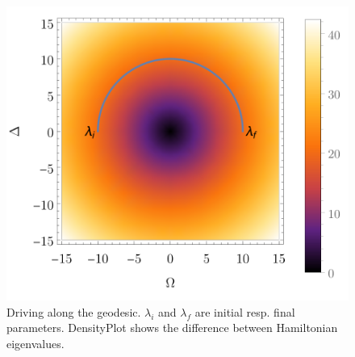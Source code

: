 \begin{figure}[H]
    \centering
    \includegraphics[scale=1.2]{../img/driving.pdf}
    \caption{Driving along the geodesic. $\lambda_i$ and $\lambda_f$ are initial resp. final parameters. DensityPlot shows the difference between Hamiltonian eigenvalues.}
    \label{fig:driving}
\end{figure}


